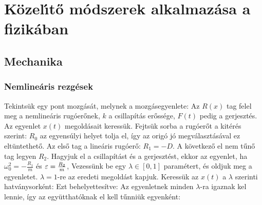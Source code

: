 \chapter{K\"ozel{\'\i}t\H{o} m\'odszerek alkalmaz\'asa a fizik\'aban}
 
 \section{Mechanika} 
  
  \subsection{Nemlineáris rezgések}
   
   Tekintsük egy pont mozgását, melynek a mozgásegyenlete: 
   Az $R(x)$ tag felel meg a nemlineáris rugóerőnek, $k$ a  csillapítás erőssége, $F(t)$ pedig a gerjesztés. Az egyenlet $x(t)$ megoldásait keressük. Fejtsük sorba a rugóerőt a kitérés szerint:
   $R_0$ az egyensúlyi helyet tolja el, így az origó jó megválasztásával ez eltüntethető. Az első tag a lineáris rugóerő: $R_1=-D$. A következő el nem tűnő tag legyen $R_2$. Hagyjuk el a csillapítást és a gerjesztést, ekkor az egyenlet, ha $\omega_0^2=-\frac{R_1}{m}$ és $\varepsilon=\frac{R_2}{m}$,
   Vezessünk be egy $\lambda\in[0,1]$ paramétert, és oldjuk meg a 
   egyenletet. $\lambda=1$-re az eredeti megoldást kapjuk. Keressük az $x(t)$ a $\lambda$ szerinti hatványsorként:
   Ezt behelyettesítve:
   Az egyenletnek minden $\lambda$-ra igaznak kel lennie, így az együtthatóknak el kell tűnniük egyenként:
